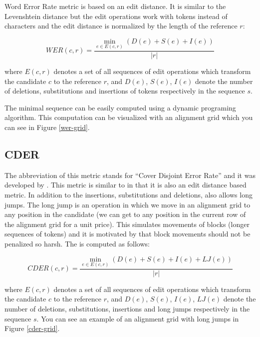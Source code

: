 Word Error Rate metric is based on an edit distance. It is similar to the Levenshtein
distance but the edit operations work with tokens instead of characters and the edit
distance is normalized by the length of the reference $r$:

\begin{equation*}
    WER(c,r) = \frac{
        \min_{e \in E(c,r)} \left( D(e) + S(e) + I(e) \right)
    }{
        |r|
    }
\end{equation*}

\noindent where $E(c,r)$ denotes a set of all sequences of edit operations
which transform the candidate $c$ to the reference $r$, and $D(e)$, $S(e)$,
$I(e)$ denote the number of deletions, substitutions and insertions of tokens
respectively in the sequence $s$.

The minimal sequence can be easily computed using a dynamic programing algorithm.
This computation can be visualized with an alignment grid which you can see
in Figure \ref{wer-grid}.


\subsection{CDER}

The abbreviation of this metric stands for ``Cover Disjoint Error Rate'' and it
was developed by . This metric is similar to
 in that it is also an edit distance based metric. In addition to the
insertions, substitutions and deletions,  also allows long jumps.
The long jump is an operation in which we move in an alignment grid to any
position in the candidate (we can get to any position in the current row of the
alignment grid for a unit price). This simulates movements of blocks (longer
sequences of tokens) and it is motivated by that block movements should not be
penalized so harsh. The  is computed as follows:

\begin{equation*}
    CDER(c,r) = \frac{
        \min_{e \in E(c,r)} \left( D(e) + S(e) + I(e) + LJ(e) \right)
    }{
        |r|
    }
\end{equation*}

\noindent where $E(c,r)$ denotes a set of all sequences of edit operations
which transform the candidate $c$ to the reference $r$, and $D(e)$, $S(e)$,
$I(e)$, $LJ(e)$ denote the number of deletions, substitutions, insertions and long
jumps respectively in the sequence $s$. You can see an example of an alignment grid with
long jumps in Figure \ref{cder-grid}.

